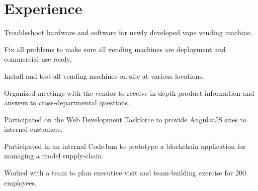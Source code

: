 \documentclass{deedy-resume-reversed}
\begin{document}
%
%

%
%

%
%

\begin{minipage}[t]{0.60\textwidth}


\section{Experience}
\vspace{\topsep} %
\begin{tightemize}
\item Troubleshoot hardware and software for newly developed vape vending machine.
\item Fix all problems to make sure all vending machines are deployment and commercial use ready.
\item Install and test all vending machines on-site at various locations.
\end{tightemize}
\sectionsep

\begin{tightemize}
\item 
\item Organized meetings with the vendor to receive in-depth product information and answers to cross-departmental questions.
\item Participated on the Web Development Taskforce to provide AngularJS sites to internal customers.
\item Participated in an internal CodeJam to prototype a blockchain application for managing a model supply-chain.
\item Worked with a team to plan executive visit and team-building exercise for 200 employees.
\end{tightemize}
\sectionsep


\end{minipage}
\end{document}
